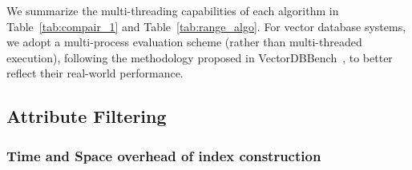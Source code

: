 \documentclass[sigconf, nonacm]{acmart}
\begin{document}
	We summarize the multi-threading capabilities of each algorithm in Table~\ref{tab:compair_1} and Table~\ref{tab:range_algo}. For vector database systems, we adopt a multi-process evaluation scheme (rather than multi-threaded execution), following the methodology proposed in VectorDBBench~\cite{VectorDBBench}, to better reflect their real-world performance.
	
	
	
	\subsection{Attribute Filtering}
	
	
	\subsubsection{Time and Space overhead of index construction}
\end{document}
